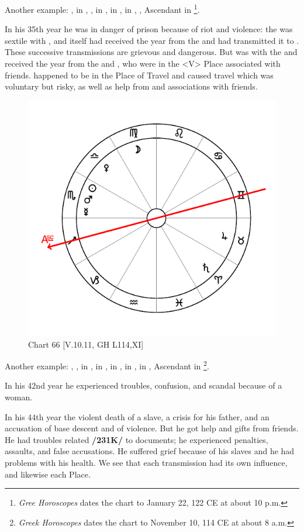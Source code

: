 \noindent Another example: \Sun, \Venus\xspace in \Aquarius, \Moon, \Jupiter\xspace in \Sagittarius, \Saturn\xspace in \Leo, \Mercury\xspace in \Capricorn, \Mars, Ascendant in \Libra\footnote{\textit{Gree Horoscopes} dates the chart to January 22, 122 CE at about 10 p.m.}. 

In his 35th year he was in danger of prison because of riot and
violence: the \Moon\xspace was sextile with \Mars, and \Mars\xspace itself had received the year from the \Moon\xspace and had transmitted it to \Saturn. These successive transmissions are grievous and dangerous. But \Jupiter\xspace was with the \Moon\xspace and received the year from the \Sun\xspace and \Venus, who were in the <V> Place associated with friends. \Jupiter\xspace happened to be in the Place of Travel and caused travel which was voluntary but risky, as well as help from and associations with friends.

\begin{figure}
\centering
\vspace{-20pt}
\includegraphics[width=.68\textwidth]{charts/5_10_11}
\caption{Chart 66 [V.10.11, GH L114,XI]}
\label{fig:chart66}
\end{figure}

\noindent Another example: \Sun, \Mars, \Mercury\xspace in \Scorpio, \Saturn\xspace in \Aries, \Moon\xspace in \Virgo, \Jupiter\xspace in \Taurus, \Venus\xspace in \Libra, Ascendant in \Sagittarius\footnote{\textit{Greek Horoscopes} dates the chart to November 10, 114 CE at about 8 a.m.}. 

In his 42nd year he experienced troubles, confusion, and scandal
because of a woman. 

\noindent In his 44th year the violent death of a slave, a crisis for his father, and an accusation of base descent and of violence. But he got help and gifts from friends. He had troubles related \textbf{/231K/} to documents; he experienced penalties, assaults, and false accusations. He suffered grief because of his slaves and he had problems with his health. We see that each transmission had its own influence, and likewise each Place.

